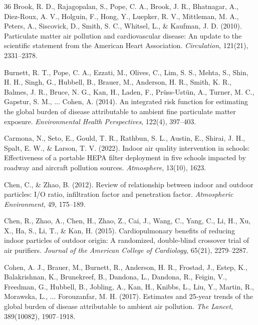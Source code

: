 \documentclass[11pt,a4paper]{article}
\begin{document}
\begin{thebibliography}{36}
Brook, R. D., Rajagopalan, S., Pope, C. A., Brook, J. R., Bhatnagar, A., Diez-Roux, A. V., Holguin, F., Hong, Y., Luepker, R. V., Mittleman, M. A., Peters, A., Siscovick, D., Smith, S. C., Whitsel, L., \& Kaufman, J. D. (2010). Particulate matter air pollution and cardiovascular disease: An update to the scientific statement from the American Heart Association. \textit{Circulation}, 121(21), 2331--2378.

Burnett, R. T., Pope, C. A., Ezzati, M., Olives, C., Lim, S. S., Mehta, S., Shin, H. H., Singh, G., Hubbell, B., Brauer, M., Anderson, H. R., Smith, K. R., Balmes, J. R., Bruce, N. G., Kan, H., Laden, F., Pr\"uss-Ust\"un, A., Turner, M. C., Gapstur, S. M., ... Cohen, A. (2014). An integrated risk function for estimating the global burden of disease attributable to ambient fine particulate matter exposure. \textit{Environmental Health Perspectives}, 122(4), 397--403.

Carmona, N., Seto, E., Gould, T. R., Rathbun, S. L., Austin, E., Shirai, J. H., Spalt, E. W., \& Larson, T. V. (2022). Indoor air quality intervention in schools: Effectiveness of a portable HEPA filter deployment in five schools impacted by roadway and aircraft pollution sources. \textit{Atmosphere}, 13(10), 1623.

Chen, C., \& Zhao, B. (2012). Review of relationship between indoor and outdoor particles: I/O ratio, infiltration factor and penetration factor. \textit{Atmospheric Environment}, 49, 175--189.

Chen, R., Zhao, A., Chen, H., Zhao, Z., Cai, J., Wang, C., Yang, C., Li, H., Xu, X., Ha, S., Li, T., \& Kan, H. (2015). Cardiopulmonary benefits of reducing indoor particles of outdoor origin: A randomized, double-blind crossover trial of air purifiers. \textit{Journal of the American College of Cardiology}, 65(21), 2279--2287.

Cohen, A. J., Brauer, M., Burnett, R., Anderson, H. R., Frostad, J., Estep, K., Balakrishnan, K., Brunekreef, B., Dandona, L., Dandona, R., Feigin, V., Freedman, G., Hubbell, B., Jobling, A., Kan, H., Knibbs, L., Liu, Y., Martin, R., Morawska, L., ... Forouzanfar, M. H. (2017). Estimates and 25-year trends of the global burden of disease attributable to ambient air pollution. \textit{The Lancet}, 389(10082), 1907--1918.


\end{thebibliography}
\end{document}
